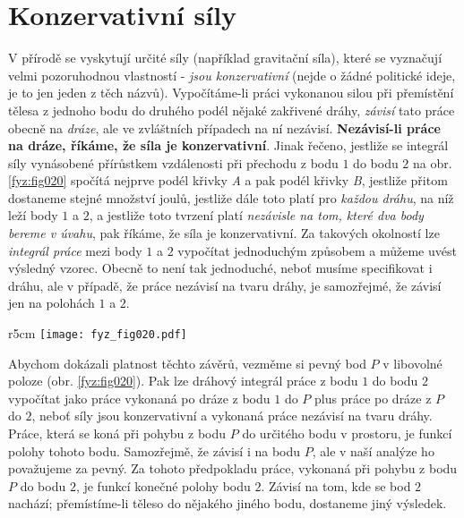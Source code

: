 {  \section{Konzervativní síly}
    V přírodě se vyskytují určité síly (například gravitační síla), které se vyznačují velmi 
    pozoruhodnou vlastností - \emph{jsou konzervativní} (nejde o žádné politické ideje, je to jen 
    jeden z těch  názvů).  Vypočítáme-li práci vykonanou silou při přemístění tělesa z 
    jednoho bodu do druhého podél nějaké zakřivené dráhy, \emph{závisí} tato práce obecně na 
    \emph{dráze}, ale ve zvláštních případech na ní nezávisí. \textbf{Nezávisí-li práce na dráze, 
    říkáme, že síla je konzervativní}. Jinak řečeno, jestliže se integrál síly vynásobené 
    přírůstkem vzdálenosti při přechodu z bodu \(1\) do bodu \(2\) na obr. \ref{fyz:fig020} spočítá 
    nejprve podél křivky \emph{A} a pak podél křivky \emph{B}, jestliže přitom dostaneme stejné 
    množství joulů, jestliže dále toto platí pro \emph{každou dráhu}, na níž leží body \(1\) a 
    \(2\), a jestliže toto tvrzení platí \emph{nezávisle na tom, které dva body bereme v úvahu}, 
    pak říkáme, že síla je konzervativní. Za takových okolností lze \emph{integrál práce} mezi body 
    \(1\) a \(2\) vypočítat jednoduchým způsobem a můžeme uvést výsledný vzorec. Obecně to není tak 
    jednoduché, neboť musíme specifikovat i dráhu, ale v případě, že práce nezávisí na tvaru dráhy, 
    je samozřejmé, že závisí jen na polohách \(1\) a \(2\).
    
    \begin{wrapfigure}[11]{r}{5cm}  %
      \centering
      \texttt{[image: fyz\_fig020.pdf]}
      \caption{Možné dráhy mezi dvěma body v silovém poli (\cite[s.~202]{Feynman01})}
      \label{fyz:fig020}
    \end{wrapfigure}
    Abychom dokázali platnost těchto závěrů, vezměme si pevný bod \(P\) v libovolné poloze (obr. 
    \ref{fyz:fig020}). Pak lze dráhový integrál práce z bodu \(1\) do bodu \(2\) vypočítat jako 
    práce vykonaná po dráze z bodu \(1\) do \(P\) plus práce po dráze z \(P\) do \(2\), neboť síly 
    jsou konzervativní a vykonaná práce nezávisí na tvaru dráhy. Práce, která se koná při pohybu z 
    bodu \(P\) do určitého bodu v prostoru, je funkcí polohy tohoto bodu. Samozřejmě, že závisí i 
    na bodu \(P\), ale v naší analýze ho považujeme za pevný. Za tohoto předpokladu práce, vykonaná 
    při pohybu z bodu \(P\) do bodu \(2\), je funkcí konečné polohy bodu \(2\). Závisí na tom, kde 
    se bod \(2\) nachází; přemístíme-li těleso do nějakého jiného bodu, dostaneme jiný výsledek.

}
